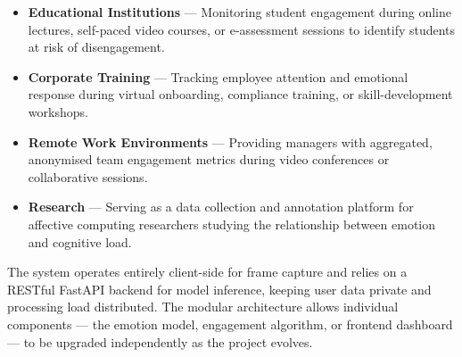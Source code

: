 \begin{itemize}
    \item \textbf{Educational Institutions} — Monitoring student engagement
          during online lectures, self-paced video courses, or e-assessment
          sessions to identify students at risk of disengagement.

    \item \textbf{Corporate Training} — Tracking employee attention and
          emotional response during virtual onboarding, compliance training,
          or skill-development workshops.

    \item \textbf{Remote Work Environments} — Providing managers with
          aggregated, anonymised team engagement metrics during video
          conferences or collaborative sessions.

    \item \textbf{Research} — Serving as a data collection and annotation
          platform for affective computing researchers studying the relationship
          between emotion and cognitive load.
\end{itemize}

The system operates entirely client-side for frame capture and relies on a
RESTful FastAPI backend for model inference, keeping user data private and
processing load distributed. The modular architecture allows individual
components — the emotion model, engagement algorithm, or frontend dashboard —
to be upgraded independently as the project evolves.

